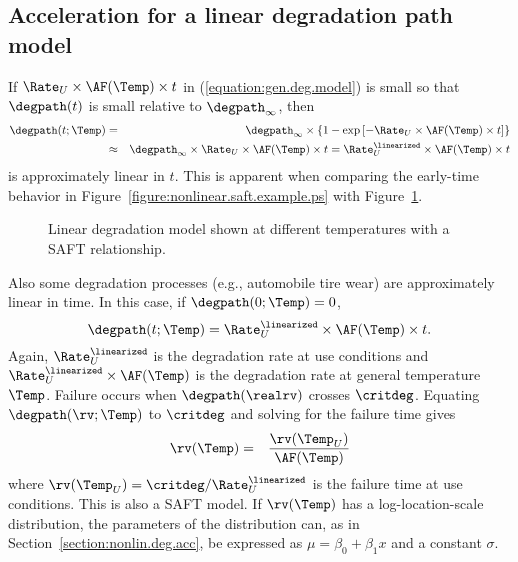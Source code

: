 \subsection{Acceleration for a linear degradation path model}
\label{section:linear.degradation}
If $\Rate_{U} \times \AF(\Temp) \times t$ in (\ref{equation:gen.deg.model})
is small so that $\degpath(t)$ is small relative to
$\degpath_{\infty}$, then
\begin{eqnarray}
\degpath(t;\Temp) &=& \degpath_{\infty} \times
\left \{1 -  \exp \left [-\Rate_{U} \times \AF(\Temp) \times t                \right ]
\right \} \nonumber \\
  &\approx& \degpath_{\infty} \times  \Rate_{U} \times \AF(\Temp) \times t =
\Rate^{\linearized}_{U} \times \AF(\Temp) \times t
\label{equation:linear.deg.path}
\end{eqnarray}
is approximately linear in $t$.
This is apparent when comparing the early-time behavior in
Figure~\ref{figure:nonlinear.saft.example.ps} with 
Figure~\ref{figure:linear.saft.example.ps}.
\begin{figure}
\caption{Linear degradation model shown at different temperatures
with a SAFT relationship.}
\label{figure:linear.saft.example.ps}
\end{figure}
Also some degradation processes (e.g., automobile tire wear)
are approximately linear in time. In this case, if $\degpath(0;\Temp) =0$,
\begin{displaymath}
\degpath(t;\Temp) = \Rate^{\linearized}_{U} \times \AF(\Temp) \times t.
\end{displaymath}
Again, $\Rate^{\linearized}_{U}$ is the degradation rate at use
conditions and $\Rate^{\linearized}_{U} \times \AF(\Temp)$ is the
degradation rate at general temperature $\Temp$.  Failure occurs
when $\degpath(\realrv)$ crosses $\critdeg$.  Equating
$\degpath(\rv;\Temp)$ to $\critdeg$ and solving for the failure time
gives
\begin{eqnarray*}
{\rv}(\Temp) &=& \frac{{\rv}(\Temp_{U})}
                      {\AF(\Temp)}
\end{eqnarray*}
where ${\rv}(\Temp_{U})={\critdeg}/{\Rate^{\linearized}_{U}}$ is the
failure time at use conditions.  This is also a SAFT model. If
$\rv(\Temp)$ has a log-location-scale distribution, the parameters
of the distribution can, as in Section~\ref{section:nonlin.deg.acc},
be expressed as $\mu = \beta_{0}+ \beta_{1} x$ and a constant
$\sigma$.

